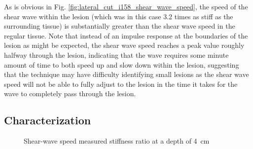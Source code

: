 			As is obvious in Fig. \ref{fig:lateral_cut_i158_shear_wave_speed}, the speed of the shear wave within the lesion (which was in this case 3.2 times as stiff as the surrounding tissue) is substantially greater than the shear wave speed in the regular tissue. Note that instead of an impulse response at the boundaries of the lesion as might be expected, the shear wave speed reaches a peak value roughly halfway through the lesion, indicating that the wave requires some minute amount of time to both speed up and slow down within the lesion, suggesting that the technique may have difficulty identifying small lesions as the shear wave speed will not be able to fully adjust to the lesion in the time it takes for the wave to completely pass through the lesion.

		\subsection{Characterization}

			\begin{figure}[!t]
				\centering
				\caption[Shear-wave speed measured stiffness ratio at a depth of \SI{4}{\cm}]{Shear-wave speed measured stiffness ratio at a depth of \SI{4}{\cm}}
				\label{fig:erel_doff_d4}
			\end{figure}